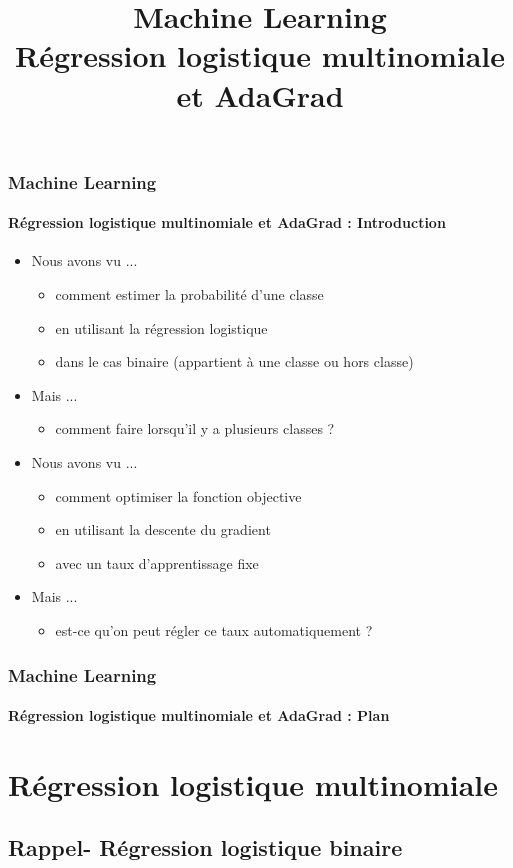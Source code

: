 \documentclass[xcolor=table]{beamer}
\title[ML : Régression multinomiale et AdaGrad] %
{Machine Learning \\Régression logistique multinomiale et AdaGrad}
\begin{document}
	
\begin{frame}
	\frametitle{Machine Learning}
	\framesubtitle{Régression logistique multinomiale et AdaGrad : Introduction}
	
	\begin{itemize}
		\item Nous avons vu ...
		\begin{itemize}
			\item comment estimer la probabilité d'une classe
			\item en utilisant la régression logistique
			\item dans le cas binaire (appartient à une classe ou hors classe)
		\end{itemize}
		\item Mais ...
		\begin{itemize}
			\item comment faire lorsqu'il y a plusieurs classes ?
		\end{itemize}
		\item Nous avons vu ...
		\begin{itemize}
			\item comment optimiser la fonction objective
			\item en utilisant la descente du gradient
			\item avec un taux d'apprentissage fixe
		\end{itemize}
		\item Mais ...
		\begin{itemize}
			\item est-ce qu'on peut régler ce taux automatiquement ?
		\end{itemize}
	\end{itemize}
\end{frame}


\begin{frame}
	\frametitle{Machine Learning}
	\framesubtitle{Régression logistique multinomiale et AdaGrad : Plan}
	
	\begin{multicols}{2}
		\tableofcontents
	\end{multicols}
\end{frame}

\section{Régression logistique multinomiale}

\subsection{Rappel- Régression logistique binaire}
\end{document}
